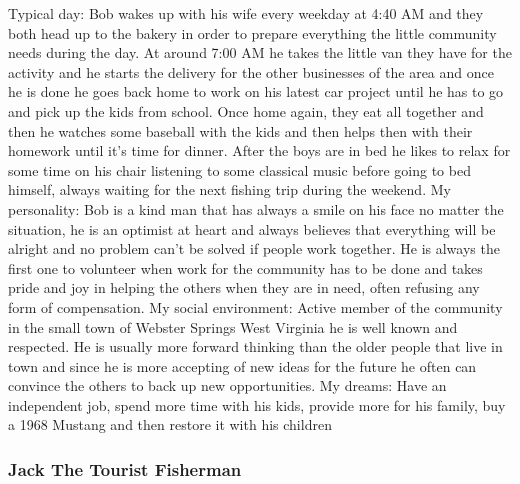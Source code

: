 Typical day: \newline
Bob wakes up with his wife every weekday at 4:40 AM and they both head up to the bakery in order to prepare everything the little community needs during the day. At around 7:00 AM he takes the little van they have for the activity and he starts the delivery for the other businesses of the area and once he is done he goes back home to work on his latest car project until he has to go and pick up the kids from school. Once home again, they eat all together and then he watches some baseball with the kids and then helps then with their homework until it's time for dinner. After the boys are in bed he likes to relax for some time on his chair listening to some classical music before going to bed himself, always waiting for the next fishing trip during the weekend. \newline
My personality: \newline
Bob is a kind man that has always a smile on his face no matter the situation, he is an optimist at heart and always believes that everything will be alright and no problem can't be solved if people work together. He is always the first one to volunteer when work for the community has to be done and takes pride and joy in helping the others when they are in need, often refusing any form of compensation. \newline
My social environment: \newline
Active member of the community in the small town of Webster Springs West Virginia he is well known and respected. He is usually more forward thinking than the older people that live in town and since he is more accepting of new ideas for the future he often can convince the others to back up new opportunities. \newline
My dreams: \newline
Have an independent job, spend more time with his kids, provide more for his family, buy a 1968 Mustang and then restore it with his children

\subsubsection*{Jack The Tourist Fisherman}

